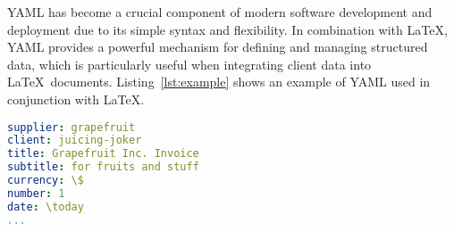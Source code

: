 YAML has become a crucial component of modern software development and deployment due to its simple syntax and flexibility. In combination with \LaTeX, YAML provides a powerful mechanism for defining and managing structured data, which is particularly useful when integrating client data into \LaTeX\ documents. Listing~\ref{lst:example} shows an example of YAML used in conjunction with \LaTeX.

\begin{lstlisting}[language=YAML,caption={\ttfamily invoice-001.yaml},label={lst:example}]
supplier: grapefruit
client: juicing-joker
title: Grapefruit Inc. Invoice
subtitle: for fruits and stuff
currency: \$
number: 1
date: \today
...
\end{lstlisting}
